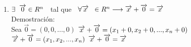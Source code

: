 \documentclass{book}
\begin{document}
\begin{enumerate}
    \item $\exists \hspace*{0.2cm}\overrightarrow{0} \in R^n\hspace*{0.2cm}$ tal que $\hspace*{0.2cm}\forall \overrightarrow{x} \hspace*{0.2cm}\in R^n \longrightarrow \overrightarrow{x}+\overrightarrow{0}=\overrightarrow{x}$
    \\Demostración:
    \\Sea $\overrightarrow{0}=(0,0,...,0)$
    $\\\overrightarrow{x}+\overrightarrow{0}=(x_{1}+0,x_{2}+0,...,x_{n}+0)$
    $\\\overrightarrow{x}+\overrightarrow{0}=(x_{1},x_{2},...,x_{n})$
    $\\\overrightarrow{x}+\overrightarrow{0}=\overrightarrow{x}$
    

\end{enumerate}
\end{document}

